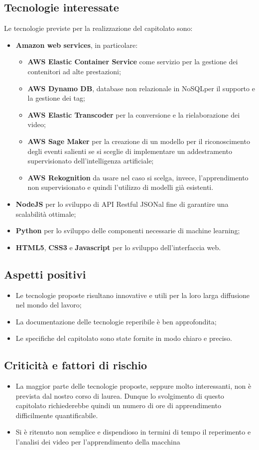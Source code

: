 \subsection{Tecnologie interessate}
Le tecnologie previste per la realizzazione del capitolato sono:
\begin{itemize}
	\item \textbf{Amazon web services\glo}, in particolare:
	\begin{itemize}
		\item \textbf{AWS Elastic Container Service\glo} come servizio per la gestione dei contenitori ad alte prestazioni;
		\item \textbf{AWS Dynamo DB\glo}, database non relazionale in NoSQL\glosp per il supporto e la gestione dei tag;
		\item \textbf{AWS Elastic Transcoder\glo} per la conversione e la rielaborazione dei video;
		\item \textbf{AWS Sage Maker\glo} per la creazione di un modello per il riconoscimento degli eventi salienti se si sceglie di implementare un addestramento supervisionato dell'intelligenza artificiale;
		\item \textbf{AWS Rekognition\glo} da usare nel caso si scelga, invece, l'apprendimento non supervisionato e quindi l'utilizzo di modelli già esistenti.
	\end{itemize}
	\item \textbf{NodeJS\glo} per lo sviluppo di API Restful JSON\glosp al fine di garantire una scalabilità ottimale;
	\item \textbf{Python\glo} per lo sviluppo delle componenti necessarie di machine learning;
	\item \textbf{HTML5\glo}, \textbf{CSS3\glo} e \textbf{Javascript\glo} per lo sviluppo dell'interfaccia web. 
\end{itemize}
\subsection{Aspetti positivi}
\begin{itemize}
	\item Le tecnologie proposte risultano innovative e utili per la loro larga diffusione nel mondo del lavoro;
	\item La documentazione delle tecnologie reperibile è ben approfondita;
	\item Le specifiche del capitolato sono state fornite in modo chiaro e preciso. 
\end{itemize}
\subsection{Criticità e fattori di rischio}
\begin{itemize}
	\item La maggior parte delle tecnologie proposte, seppure molto interessanti, non è prevista dal nostro corso di laurea. Dunque lo svolgimento di questo capitolato richiederebbe quindi un numero di ore di apprendimento difficilmente quantificabile.
	\item Si è ritenuto non semplice e dispendioso in termini di tempo il reperimento e l'analisi dei video per l'apprendimento della macchina
\end{itemize}
